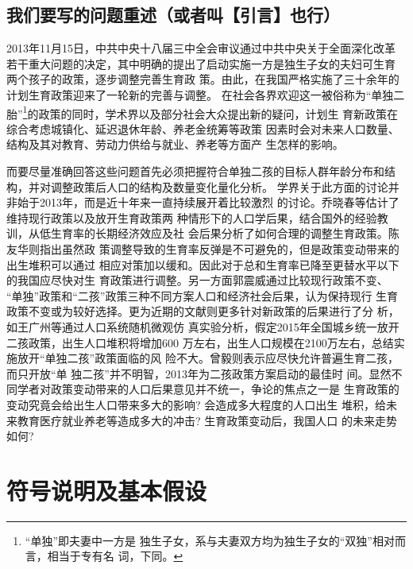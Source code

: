 \documentclass[a4paper]{article}
\begin{document}
\subsection{我们要写的问题重述（或者叫【引言】也行）}
2013年11月15日，中共中央十八届三中全会审议通过中共中央关于全面深化改革
若干重大问题的决定，其中明确的提出了启动实施一方是独生子女的夫妇可生育
两个孩子的政策，逐步调整完善生育政
策。由此，在我国严格实施了三十余年的计划生育政策迎来了一轮新的完善与调整。
在社会各界欢迎这一被俗称为“单独二胎”\footnote{``单独''即夫妻中一方是
  独生子女，系与夫妻双方均为独生子女的``双独''相对而言，相当于专有名
  词，下同。}的政策的同时，学术界以及部分社会大众提出新的疑问，计划生
育新政策在综合考虑城镇化、延迟退休年龄、养老金统筹等政策
因素时会对未来人口数量、结构及其对教育、劳动力供给与就业、养老等方面产
生怎样的影响。\par
而要尽量准确回答这些问题首先必须把握符合单独二孩的目标人群年龄分布和结
构，并对调整政策后人口的结构及数量变化量化分析。
学界关于此方面的讨论并非始于2013年，而是近十年来一直持续展开着比较激烈
的讨论。乔晓春等\cite{xiaochun06}估计了维持现行政策以及放开生育政策两
种情形下的人口学后果，结合国外的经验教训，从低生育率的长期经济效应及社
会后果分析了如何合理的调整生育政策。陈友华\cite{youhua07}则指出虽然政
策调整导致的生育率反弹是不可避免的，但是政策变动带来的出生堆积可以通过
相应对策加以缓和。因此对于总和生育率已降至更替水平以下的我国应尽快对生
育政策进行调整。另一方面郭震威\cite{zhenwei09}通过比较现行政策不变、
``单独''政策和``二孩''政策三种不同方案人口和经济社会后果，认为保持现行
生育政策不变或为较好选择。更为近期的文献则更多针对新政策的后果进行了分
析，如王广州等\cite{guangzhou12}通过人口系统随机微观仿
真实验分析，假定2015年全国城乡统一放开二孩政策，出生人口堆积将增加600
万左右，出生人口规模在2100万左右，总结实施放开``单独二孩''政策面临的风
险不大。曾毅\cite{zengyi12}则表示应尽快允许普遍生育二孩，而只开放``单
独二孩''并不明智，2013年为二孩政策方案启动的最佳时
间。显然不同学者对政策变动带来的人口后果意见并不统一，争论的焦点之一是
生育政策的变动究竟会给出生人口带来多大的影响? 会造成多大程度的人口出生
堆积，给未来教育医疗就业养老等造成多大的冲击? 生育政策变动后，我国人口
的未来走势如何?\par
\section{符号说明及基本假设}
\end{document}
